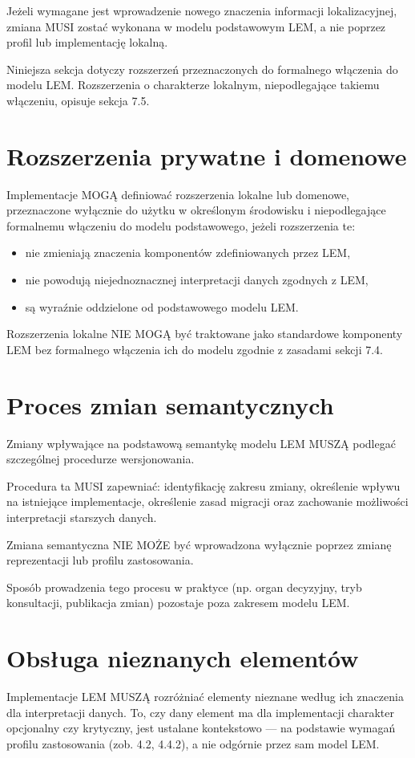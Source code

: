 Jeżeli wymagane jest wprowadzenie nowego znaczenia informacji lokalizacyjnej, zmiana MUSI zostać wykonana w modelu podstawowym LEM, a nie poprzez profil lub implementację lokalną.

Niniejsza sekcja dotyczy rozszerzeń przeznaczonych do formalnego włączenia do modelu LEM. Rozszerzenia o charakterze lokalnym, niepodlegające takiemu włączeniu, opisuje sekcja 7.5.

\section{Rozszerzenia prywatne i domenowe}
Implementacje MOGĄ definiować rozszerzenia lokalne lub domenowe, przeznaczone wyłącznie do użytku w określonym środowisku i niepodlegające formalnemu włączeniu do modelu podstawowego, jeżeli rozszerzenia te:
\begin{itemize}
    \item nie zmieniają znaczenia komponentów zdefiniowanych przez LEM,
    \item nie powodują niejednoznacznej interpretacji danych zgodnych z LEM,
    \item są wyraźnie oddzielone od podstawowego modelu LEM.
\end{itemize}

Rozszerzenia lokalne NIE MOGĄ być traktowane jako standardowe komponenty LEM bez formalnego włączenia ich do modelu zgodnie z zasadami sekcji 7.4.

\section{Proces zmian semantycznych}
Zmiany wpływające na podstawową semantykę modelu LEM MUSZĄ podlegać szczególnej procedurze wersjonowania.

Procedura ta MUSI zapewniać: identyfikację zakresu zmiany, określenie wpływu na istniejące implementacje, określenie zasad migracji oraz zachowanie możliwości interpretacji starszych danych.

Zmiana semantyczna NIE MOŻE być wprowadzona wyłącznie poprzez zmianę reprezentacji lub profilu zastosowania.

Sposób prowadzenia tego procesu w praktyce (np. organ decyzyjny, tryb konsultacji, publikacja zmian) pozostaje poza zakresem modelu LEM.

\section{Obsługa nieznanych elementów}
Implementacje LEM MUSZĄ rozróżniać elementy nieznane według ich znaczenia dla interpretacji danych. To, czy dany element ma dla implementacji charakter opcjonalny czy krytyczny, jest ustalane kontekstowo — na podstawie wymagań profilu zastosowania (zob. 4.2, 4.4.2), a nie odgórnie przez sam model LEM.

